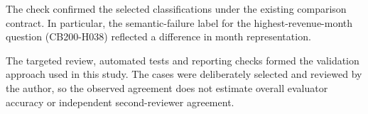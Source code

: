 The check confirmed the selected classifications under the existing comparison
contract. In particular, the semantic-failure
label for the highest-revenue-month question (CB200-H038) reflected a difference in month representation.

The targeted review, automated tests and reporting checks formed the validation
approach used in this study. The cases were deliberately selected and reviewed
by the author, so the observed agreement does not estimate overall evaluator
accuracy or independent second-reviewer agreement.
